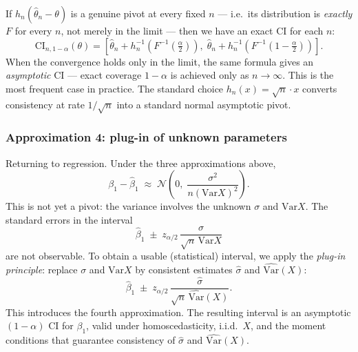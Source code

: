 \documentclass[a4paper,oneside,12pt]{extarticle}
\theoremstyle{plain}
\theoremstyle{definition}
\theoremstyle{remark}
\newcommand*{\Var}{\mathrm{Var}}
\begin{document}
If $h_n(\hat\theta_n - \theta)$ is a genuine pivot at every fixed
$n$ --- i.e.\ its distribution is \emph{exactly} $F$ for every $n$,
not merely in the limit --- then we have an exact CI for each $n$:
\[
  \mathrm{CI}_{n,1-\alpha}(\theta)
  = \left[\hat\theta_n + h_n^{-1}\!\left(F^{-1}\!\left(\tfrac{\alpha}{2}\right)\right),\;
          \hat\theta_n + h_n^{-1}\!\left(F^{-1}\!\left(1-\tfrac{\alpha}{2}\right)\right)
    \right].
\]
When the convergence holds only in the limit, the same formula gives
an \emph{asymptotic} CI --- exact coverage $1-\alpha$ is achieved
only as $n\to\infty$.  This is the most frequent case in practice.
The standard choice $h_n(x) = \sqrt{n}\cdot x$ converts consistency
at rate $1/\sqrt{n}$ into a standard normal asymptotic pivot.

\subsubsection{Approximation 4: plug-in of unknown parameters}

Returning to regression.  Under the three approximations above,
\[
  \beta_1 - \hat\beta_1 \;\approx\;
  \mathcal{N}\!\left(0,\;\frac{\sigma^2}{n(\Var X)^2}\right).
\]
This is not yet a pivot: the variance involves the unknown $\sigma$
and $\Var X$.  The standard errors in the interval
\[
  \hat\beta_1 \;\pm\; z_{\alpha/2}\,
  \frac{\sigma}{\sqrt{n}\,\Var X}
\]
are not observable.  To obtain a usable (statistical) interval, we
apply the \emph{plug-in principle}: replace $\sigma$ and $\Var X$ by
consistent estimates $\hat\sigma$ and $\widehat{\Var}(X)$:
\[
  \hat\beta_1 \;\pm\; z_{\alpha/2}\,
  \frac{\hat\sigma}{\sqrt{n}\,\widehat{\Var}(X)}.
\]
This introduces the fourth approximation.  The resulting interval is
an asymptotic $(1-\alpha)$ CI for $\beta_1$, valid under
homoscedasticity, i.i.d.\ $X$, and the moment conditions that
guarantee consistency of $\hat\sigma$ and $\widehat{\Var}(X)$.
\end{document}
